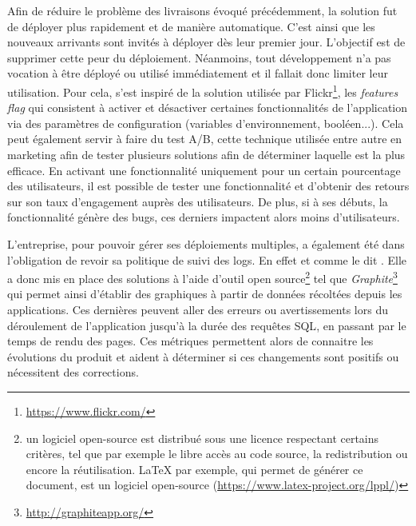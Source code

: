 Afin de réduire le problème des livraisons évoqué précédemment, la solution fut de déployer plus rapidement et de manière automatique. C'est ainsi que les nouveaux arrivants sont invités à déployer dès leur premier jour. L'objectif est de supprimer cette peur du déploiement. Néanmoins, tout développement n'a pas vocation à être déployé ou utilisé immédiatement et il fallait donc limiter leur utilisation. Pour cela, \etsy{} s'est inspiré de la solution utilisée par Flickr\footnote{\url{https://www.flickr.com/}}, les \emph{features flag} qui consistent à activer et désactiver certaines fonctionnalités de l'application via des paramètres de configuration (variables d'environnement, booléen...). Cela peut également servir à faire du test A/B, cette technique utilisée entre autre en marketing afin de tester plusieurs solutions afin de déterminer laquelle est la plus efficace. En activant une fonctionnalité uniquement pour un certain pourcentage des utilisateurs, il est possible de tester une fonctionnalité et d'obtenir des retours sur son taux d'engagement auprès des utilisateurs. De plus, si à ses débuts, la fonctionnalité génère des bugs, ces derniers impactent alors moins d'utilisateurs.

L'entreprise, pour pouvoir gérer ses déploiements multiples, a également été dans l'obligation de revoir sa politique de suivi des logs. En effet et comme \etsy{} le dit . Elle a donc mis en place des solutions à l'aide d'outil open source\footnote{un logiciel open-source est distribué sous une licence respectant certains critères, tel que par exemple le libre accès au code source, la redistribution ou encore la réutilisation. \LaTeX{} par exemple, qui permet de générer ce document, est un logiciel open-source (\url{https://www.latex-project.org/lppl/})} tel que \emph{Graphite}\footnote{\url{http://graphiteapp.org/}} qui permet ainsi d'établir des graphiques à partir de données récoltées depuis les applications. Ces dernières peuvent aller des erreurs ou avertissements lors du déroulement de l'application jusqu'à la durée des requêtes \gls{SQL}, en passant par le temps de rendu des pages. Ces métriques permettent alors de connaitre les évolutions du produit et aident à déterminer si ces changements sont positifs ou nécessitent des corrections.

